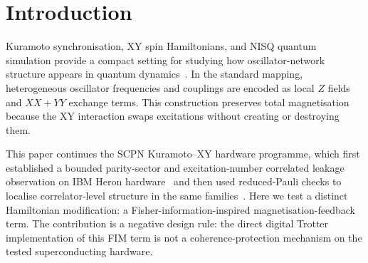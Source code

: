 \documentclass[preprint,aps,physrev,superscriptaddress,floatfix,longbibliography]{revtex4-2}
\begin{document}
\begin{abstract}
($p=1.19\times10^{-48}$). We then executed a dedicated replication/ZNE lane
on \texttt{ibm\_marrakesh} and \texttt{ibm\_fez}. After full readout
mitigation and linear ZNE, the mean $\lambda=4$ minus $\lambda=0$
magnetisation-leakage deltas remained positive in the $n=4$ replication:
$+0.0599$ on Marrakesh and $+0.1937$ on Fez. Larger $n=6,8$ Fez/Marrakesh
replication/ZNE lanes were then executed. They preserve the falsification
boundary rather than promoting FIM protection: all four larger lanes show
positive mean raw scale-1 magnetisation-leakage deltas, with linear-ZNE deltas
of $0.4021$, $0.1480$, $0.2541$, and $0.4203$ for Fez $n=6$, Fez $n=8$,
Marrakesh $n=6$, and Marrakesh $n=8$, respectively. Thus the tested digital
Trotter implementation falsifies the simple hypothesis that this FIM term acts
as a hardware coherence-protection mechanism. The paper is deliberately
bounded: the artefacts support exact
small-system Hamiltonian findings and a backend/circuit-specific negative
hardware result on IBM Heron devices. They do not demonstrate
hardware coherence improvement, quantum advantage, strict many-body
localisation, or universal protection.
\end{abstract}

\maketitle

\section{Introduction}

Kuramoto synchronisation, XY spin Hamiltonians, and NISQ quantum simulation
provide a compact setting for studying how oscillator-network structure appears
in quantum dynamics~\cite{Kuramoto1975,Acebron2005,Barahona1982}. In the
standard mapping, heterogeneous oscillator frequencies and couplings are encoded
as local $Z$ fields and $XX+YY$ exchange terms. This construction preserves
total magnetisation because the XY interaction swaps excitations without
creating or destroying them.

This paper continues the SCPN Kuramoto--XY hardware programme, which first
established a bounded parity-sector and excitation-number correlated leakage
observation on IBM Heron hardware~\cite{SotekDLA2026} and then used
reduced-Pauli checks to localise correlator-level structure in the same
families~\cite{SotekPhase3ReducedPauli2026}. Here we test a distinct
Hamiltonian modification: a Fisher-information-inspired magnetisation-feedback
term. The contribution is a negative design rule: the direct digital Trotter
implementation of this FIM term is not a coherence-protection mechanism on the
tested superconducting hardware.
\end{document}
